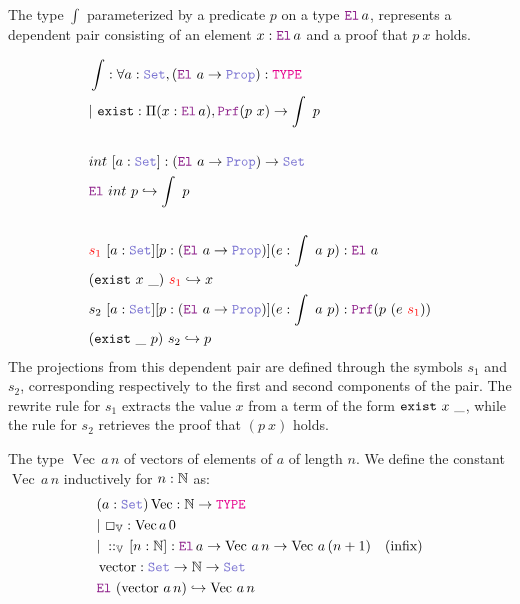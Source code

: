 \begin{definition}\label{dep-pair-def}
The type $\int$ parameterized by a predicate $p$ on a type $\el\,a$, represents a dependent pair consisting of an element $x : \el\,a$ and a proof that $p~x$ holds.

\begin{align*}
&\int : \forall a : \set{}, (\el{}~a \ra \prop): \type \\
&|~\kw{exist} : \Pi (x :\el{}\,a), \prf (p~x) \ra \int~p \\
&\\
& int~[a: \set{}]: (\el{}~a \ra \prop) \ra \set{} \\
& \el{}~int~p \re \int~p \\
&\\
& \textcolor{red}{s_1}~[a: \set{}] [p:(\el{}~a \ra \prop)] (e: \int~a~p): \el{}~a \\
& (\kw{exist}~x~\_)~\textcolor{red}{s_1} \re x\\
& s_2~[a: \set{}] [p:(\el{}~a \ra \prop)] (e: \int~a~p): \prf{}(p~(e~\textcolor{red}{s_1})) \\
& (\kw{exist}~\_~p)~s_2 \re p\\
\end{align*}
The projections from this dependent pair are defined through the symbols $s_1$ and $s_2$, corresponding respectively to the first and second components of the pair.
The rewrite rule for $s_1$ extracts the value $x$ from a term of the form $\texttt{\upshape{exist}}~x~\_$, while the rule for $s_2$ retrieves the proof that $(p~x)$ holds.
\end{definition}

\begin{definition}\label{def:dependent-vector}
The type \( \mathop{\mathrm{Vec}}\,a\,n \) of vectors of elements of $a$ of length $n$.
We define the constant \( \mathop{\mathrm{Vec}}\,a\,n \) inductively for \( n : \mathbb{N} \) as:
\begin{align*}
&(a: \set) \mathop{\mathrm{Vec}}: \N \ra \type \\
&|~\Box_\bb{V} : \mathop{\mathrm{Vec}} a \, 0 \\
&|~\cons_\bb{V}\,[n:\N]: \el\,a \ra \mathop{\mathrm{Vec}}\,a\,n \ra  \mathop{\mathrm{Vec}}\,a\,(n +1) \quad (\text{infix})\\
&\mathop{\mathrm{vector}}: \set \ra \N \ra \set \\
&\el~(\mathop{\mathrm{vector}}\,a\,n) \re \mathop{\mathrm{Vec}}\,a\,n
\end{align*}
\end{definition}

